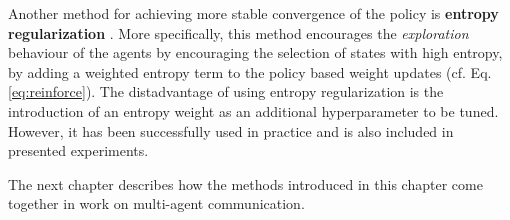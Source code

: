 Another method for achieving more stable convergence of the policy is \textbf{entropy regularization} \parencite{williams1991function, mnih2016asynchronous}. More specifically, this method encourages the \textit{exploration} behaviour of the agents by encouraging the selection of states with high entropy, by adding a weighted entropy term to the policy based weight updates (cf. Eq. \ref{eq:reinforce}). The distadvantage of using entropy regularization is the introduction of an entropy weight as an additional hyperparameter to be tuned. However, it has been successfully used in practice and is also included in presented experiments.

The next chapter describes how the methods introduced in this chapter come together in work on multi-agent communication.

